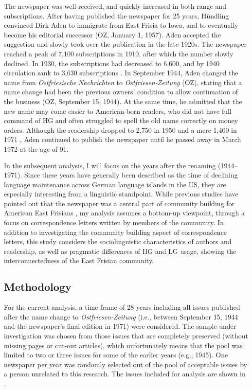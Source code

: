 \documentclass[output=paper]{langsci/langscibook}
\begin{document}
The newspaper was well-received, and quickly increased in both range and subscriptions. After having published the newspaper for 25 years, Hündling convinced Dirk Aden to immigrate from East Frisia to Iowa, and to eventually become his editorial successor (OZ, January 1, 1957). Aden accepted the suggestion and slowly took over the publication in the late 1920s. The newspaper reached a peak of 7,100 subscriptions in 1910, after which the number slowly declined. In 1930, the subscriptions had decreased to 6,600, and by 1940 circulation sank to 3,630 subscriptions \citep[79]{Lindaman2004}. In September 1944, Aden changed the name from \textit{Ostfriesische} \textit{Nachrichten} to \textit{Ostfriesen-Zeitung} (OZ), stating that a name change had been the previous owners’ condition to allow continuation of the business (OZ, September 15, 1944). At the same time, he admitted that the new name may come easier to American-born readers, who did not have full command of HG and often struggled to spell the old name correctly on money orders. Although the readership dropped to 2,750 in 1950 \citep[79]{Lindaman2004} and a mere 1,400 in 1971 \citep{Monahan1971}, Aden continued to publish the newspaper until he passed away in March 1972 at the age of 91.

In the subsequent analysis, I will focus on the years after the renaming (1944--1971). Since these years have generally been described as the time of declining language maintenance across German language islands in the US, they are especially interesting from a linguistic standpoint. While previous studies have pointed out that the newspaper was a central part of community building for American East Frisians \citep{Lindaman2002,Lindaman2004}, my analysis assumes a bottom-up viewpoint, through a focus on correspondence letters written by members of the community. In addition to investigating the community building aspect of correspondence letters, this study considers the sociolinguistic characteristics of authors and readership, as well as pragmatic differences of HG and LG usage, showing the interconnectedness of the East Frisian community.

\subsection{Methodology} %
\label{sec:rocker:}

For the current analysis, a time frame of 28 years including all issues published after the name change to \textit{Ostfriesen-Zeitung} (i.e., between September 15, 1944 and the newspaper’s final edition in 1971) were considered. The sample under investigation was chosen from those issues that are completely preserved (without missing pages or cut-out articles), which unfortunately means that the pool was limited to two or three issues for some of the earlier years (e.g., 1945). One newspaper per year was randomly selected out of the pool of acceptable issues by a person unrelated to this research. The issues included for analysis are shown in . 
 
\end{document}

